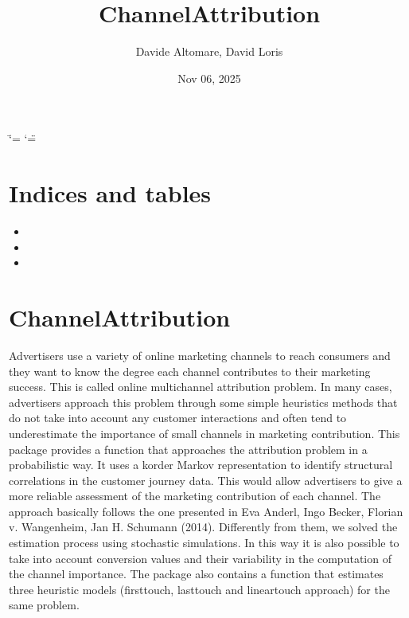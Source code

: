 \documentclass[letterpaper,10pt,english]{sphinxmanual}
\title{ChannelAttribution}
\date{Nov 06, 2025}
\author{Davide Altomare, David Loris}
\begin{document}
\ifdefined\shorthandoff
  \ifnum\catcode`\=\string=\active\shorthandoff{=}\fi
  \ifnum\catcode`\"=\active{}\fi
\fi

\pagestyle{empty}
\sphinxmaketitle
\pagestyle{plain}
\sphinxtableofcontents
\pagestyle{normal}
\label{\detokenize{index::doc}}



\chapter{Indices and tables}
\label{\detokenize{index:indices-and-tables}}\begin{itemize}
\item {} 
\sphinxAtStartPar
{}

\item {} 
\sphinxAtStartPar
{}

\item {} 
\sphinxAtStartPar
{}

\end{itemize}


\chapter{ChannelAttribution}
\label{\detokenize{index:module-ChannelAttribution}}\label{\detokenize{index:channelattribution}}
\sphinxAtStartPar
{}
Advertisers use a variety of online marketing channels to reach consumers and they want to know the degree each channel contributes to their marketing success. This is called online multichannel attribution problem. In many cases, advertisers approach this problem through some simple heuristics methods that do not take into account any customer interactions and often tend to underestimate the importance of small channels in marketing contribution. This package provides a function that approaches the attribution problem in a probabilistic way. It uses a k\sphinxhyphen{}order Markov representation to identify structural correlations in the customer journey data. This would allow advertisers to give a more reliable assessment of the marketing contribution of each channel. The approach basically follows the one presented in Eva Anderl, Ingo Becker, Florian v. Wangenheim,
Jan H. Schumann (2014). Differently from them, we solved the estimation process using stochastic simulations. In this way it is also possible to take into account conversion values and their variability in the computation of the channel importance. The package also contains a function that estimates three heuristic models (first\sphinxhyphen{}touch, last\sphinxhyphen{}touch and linear\sphinxhyphen{}touch approach) for the same problem.
\end{document}

